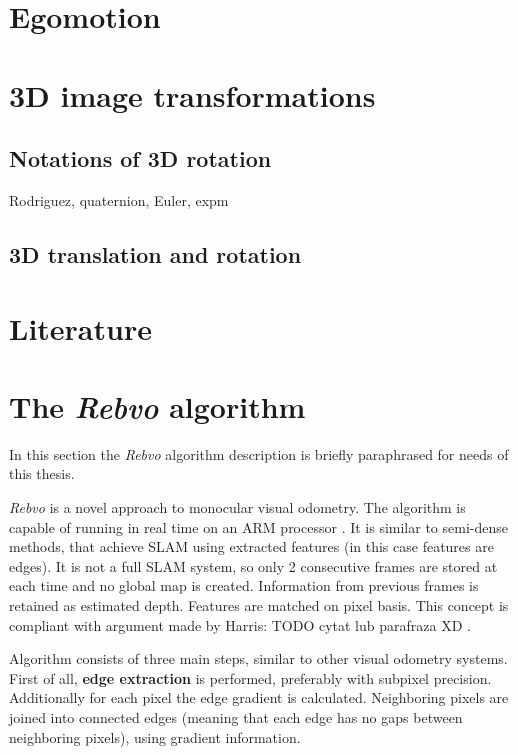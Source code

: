 
\section{Egomotion}
\label{sec:ego}


\section{3D image transformations}
\label{sec:3dtrans}

\subsection{Notations of 3D rotation}

Rodriguez, quaternion, Euler, expm

\subsection{3D translation and rotation}


\section{Literature}



\section{The \textit{Rebvo} algorithm}

In this section the \textit{Rebvo} algorithm \cite{jose2015realtime} description is briefly paraphrased for needs of this thesis.

\textit{Rebvo} is a novel approach to monocular visual odometry. The algorithm is capable of running in real time on an ARM processor \cite{jose2015realtime}. It is similar to semi-dense methods, that achieve SLAM using extracted features (in this case features are edges). It is not a full SLAM system, so only 2 consecutive frames are stored at each time and no global map is created. Information from previous frames is retained as estimated depth. Features are matched on pixel basis. This concept is compliant with argument made by Harris: TODO cytat lub parafraza XD \cite{harris}.

Algorithm consists of three main steps, similar to other visual odometry systems. First of all, \textbf{edge extraction} is performed, preferably with subpixel precision. Additionally for each pixel the edge gradient is calculated. Neighboring pixels are joined into connected edges (meaning that each edge has no gaps between neighboring pixels), using gradient information.

